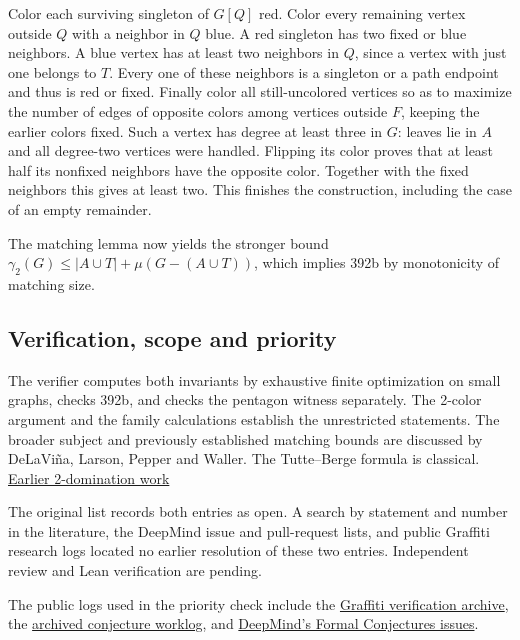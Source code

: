 \documentclass[11pt]{article}
\begin{document}
Color each surviving singleton of \(G[Q]\) red. Color every remaining vertex outside \(Q\) with a neighbor in \(Q\) blue. A red singleton has two fixed or blue neighbors. A blue vertex has at least two neighbors in \(Q\), since a vertex with just one belongs to \(T\). Every one of these neighbors is a singleton or a path endpoint and thus is red or fixed. Finally color all still-uncolored vertices so as to maximize the number of edges of opposite colors among vertices outside \(F\), keeping the earlier colors fixed. Such a vertex has degree at least three in \(G\): leaves lie in \(A\) and all degree-two vertices were handled. Flipping its color proves that at least half its nonfixed neighbors have the opposite color. Together with the fixed neighbors this gives at least two. This finishes the construction, including the case of an empty remainder.

The matching lemma now yields the stronger bound \(\gamma_2(G)\le |A\cup T|+\mu(G-(A\cup T))\), which implies 392b by monotonicity of matching size.

\subsection{Verification, scope and priority}\label{verification-scope-and-priority}

The verifier computes both invariants by exhaustive finite optimization on small graphs, checks 392b, and checks the pentagon witness separately. The 2-color argument and the family calculations establish the unrestricted statements. The broader subject and previously established matching bounds are discussed by DeLaViña, Larson, Pepper and Waller. The Tutte--Berge formula is classical. \href{https://www.uhd.edu/documents/academics/sciences/gpcon2-dominmay17.pdf}{Earlier 2-domination work}

The original list records both entries as open. A search by statement and number in the literature, the DeepMind issue and pull-request lists, and public Graffiti research logs located no earlier resolution of these two entries. Independent review and Lean verification are pending.

The public logs used in the priority check include the \href{https://gitlab.com/ai-village-agents/village/graffiti-verification}{Graffiti verification archive}, the \href{https://gist.github.com/siddhantdubey/22f22a7a23db5174ee59e32eaa8724aa}{archived conjecture worklog}, and \href{https://github.com/google-deepmind/formal-conjectures/issues}{DeepMind's Formal Conjectures issues}.
\end{document}

